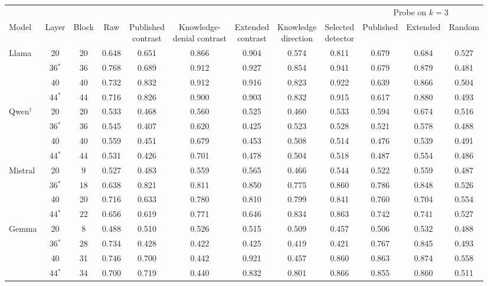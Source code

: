 \begin{tabular}{@{}l cc cccccc ccc@{}}
\toprule
 & & & & & & & & & \multicolumn{3}{c}{Probe on $k = 3$} \\
\cmidrule(lr){10-12}
Model & Layer & Block & Raw & \shortstack{Published\\contrast} & \shortstack{Knowledge-\\denial contrast} & \shortstack{Extended\\contrast} & \shortstack{Knowledge\\direction} & \shortstack{Selected\\detector} & Published & Extended & Random \\
\midrule
Llama & 20 & 20 & 0.648 & 0.651 & 0.866 & 0.904 & 0.574 & 0.811 & 0.679 & 0.684 & 0.527 \\
 & 36$^*$ & 36 & 0.768 & 0.689 & 0.912 & 0.927 & 0.854 & 0.941 & 0.679 & 0.879 & 0.481 \\
 & 40 & 40 & 0.732 & 0.832 & 0.912 & 0.916 & 0.823 & 0.922 & 0.639 & 0.866 & 0.504 \\
 & 44$^*$ & 44 & 0.716 & 0.826 & 0.900 & 0.903 & 0.832 & 0.915 & 0.617 & 0.880 & 0.493 \\
\addlinespace
Qwen$^\dagger$ & 20 & 20 & 0.533 & 0.468 & 0.560 & 0.525 & 0.460 & 0.533 & 0.594 & 0.674 & 0.516 \\
 & 36$^*$ & 36 & 0.545 & 0.407 & 0.620 & 0.425 & 0.523 & 0.528 & 0.521 & 0.578 & 0.488 \\
 & 40 & 40 & 0.559 & 0.451 & 0.679 & 0.453 & 0.508 & 0.514 & 0.476 & 0.539 & 0.491 \\
 & 44$^*$ & 44 & 0.531 & 0.426 & 0.701 & 0.478 & 0.504 & 0.518 & 0.487 & 0.554 & 0.486 \\
\addlinespace
Mistral & 20 & 9 & 0.527 & 0.483 & 0.559 & 0.565 & 0.466 & 0.544 & 0.522 & 0.559 & 0.487 \\
 & 36$^*$ & 18 & 0.638 & 0.821 & 0.811 & 0.850 & 0.775 & 0.860 & 0.786 & 0.848 & 0.526 \\
 & 40 & 20 & 0.716 & 0.633 & 0.780 & 0.810 & 0.799 & 0.841 & 0.760 & 0.704 & 0.554 \\
 & 44$^*$ & 22 & 0.656 & 0.619 & 0.771 & 0.646 & 0.834 & 0.863 & 0.742 & 0.741 & 0.527 \\
\addlinespace
Gemma & 20 & 8 & 0.488 & 0.510 & 0.526 & 0.515 & 0.509 & 0.457 & 0.506 & 0.532 & 0.488 \\
 & 36$^*$ & 28 & 0.734 & 0.428 & 0.422 & 0.425 & 0.419 & 0.421 & 0.767 & 0.845 & 0.493 \\
 & 40 & 31 & 0.746 & 0.700 & 0.442 & 0.921 & 0.457 & 0.860 & 0.863 & 0.874 & 0.558 \\
 & 44$^*$ & 34 & 0.700 & 0.719 & 0.440 & 0.832 & 0.801 & 0.866 & 0.855 & 0.860 & 0.511 \\
\bottomrule
\end{tabular}
